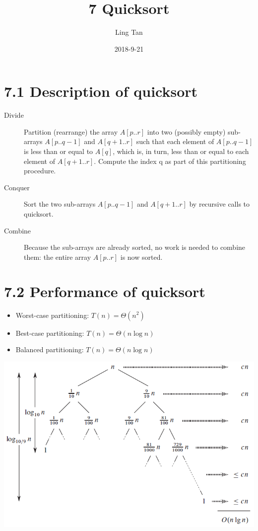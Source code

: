 \documentclass[a4paper]{article}
\title{7 Quicksort}
\author{Ling Tan}
\date{2018-9-21}
\begin{document}

\section*{7.1 Description of quicksort}
\begin{description}
\item[Divide] Partition (rearrange) the array $A[p..r]$ into two (possibly empty) sub-arrays $A[p..q-1]$ and $A[q+1..r]$ such that each element of $A[p..q-1]$ is less than or equal to $A[q]$, which is, in turn, less than or equal to each element of $A[q+1..r]$. Compute the index q as part of this partitioning procedure.
\item[Conquer] Sort the two sub-arrays $A[p..q-1]$ and $A[q+1..r]$ by recursive calls to quicksort.
\item[Combine] Because the sub-arrays are already sorted, no work is needed to combine them: the entire array $A[p..r]$ is now sorted.
\end{description}
\section*{7.2 Performance of quicksort}
\begin{itemize}
    \item Worst-case partitioning: $T(n)=\Theta(n^2)$
    \item Best-case partitioning: $T(n)=\Theta(n\log n)$
    \item Balanced partitioning: $T(n)=\Theta(n\log n)$
\end{itemize}
\includegraphics[scale=0.7]{"Balanced partitioning"}
\end{document}
